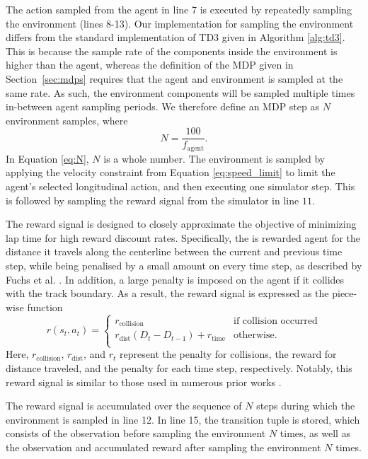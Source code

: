 The action sampled from the agent in line 7 is executed by repeatedly sampling the environment (lines 8-13).
Our implementation for sampling the environment differs from the standard implementation of TD3 given in Algorithm \ref{alg:td3}.
This is because the sample rate of the components inside the environment is higher than the agent, whereas the definition of the MDP given in Section~\ref{sec:mdps} requires that the agent and environment is sampled at the same rate.
As such, the environment components will be sampled multiple times in-between agent sampling periods.
We therefore define an MDP step as $N$ environment samples, where
\begin{equation}
N = \frac{100}{f_{\text{agent}}}.
\label{eq:N}
\end{equation}
In Equation \ref{eq:N}, $N$ is a whole number.
The environment is sampled by applying the velocity constraint from Equation \ref{eq:speed_limit} to limit the agent's selected longitudinal action, and then executing one simulator step.
This is followed by sampling the reward signal from the simulator in line $11$.

The reward signal is designed to closely approximate the objective of minimizing lap time for high reward discount rates.
Specifically, the is rewarded agent for the distance it travels along the centerline between the current and previous time step, while being penalised 
by a small amount on every time step, as described by Fuchs et al. \cite{Fuchs2021}. 
In addition, a large penalty is imposed on the agent if it collides with the track boundary. 
As a result, the reward signal is expressed as the piece-wise function
\begin{dmath}
r(s_t,a_t) = 
\begin{cases}
r_{\text{collision}} & \mbox{if collision occurred} \\
r_{\text{dist}}(D_{t} - D_{t-1}) + r_{\text{time}} & \mbox{otherwise.} \\
\end{cases}
\label{eq:reward_signal}
\end{dmath}
Here, $r_{\text{collision}}$, $r_{\text{dist}}$, and $r_{t}$ represent the penalty for collisions, the reward for distance traveled, and the penalty for each time step, respectively. 
Notably, this reward signal is similar to those used in numerous prior works \cite{Song2021, Ivanov2020, Perot2017}.

The reward signal is accumulated over the sequence of $N$ steps during which the environment is sampled in line 12.
In line 15, the transition tuple is stored, which consists of the observation before sampling the environment $N$ times, as well as the observation and accumulated reward after sampling the environment $N$ times.

